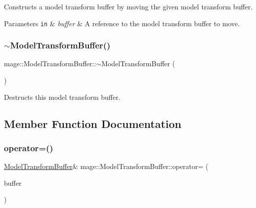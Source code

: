 Constructs a model transform buffer by moving the given model transform buffer.


\begin{DoxyParams}[1]{Parameters}
\mbox{\tt in}  & {\em buffer} & A reference to the model transform buffer to move. \\
\hline
\end{DoxyParams}
\hypertarget{structmage_1_1_model_transform_buffer_a08e8a2d136cfbdaa9f13917cdeec9b03}{}\label{structmage_1_1_model_transform_buffer_a08e8a2d136cfbdaa9f13917cdeec9b03} 
\subsubsection{\texorpdfstring{$\sim$\+Model\+Transform\+Buffer()}{~ModelTransformBuffer()}}
{\footnotesize\ttfamily mage\+::\+Model\+Transform\+Buffer\+::$\sim$\+Model\+Transform\+Buffer (\begin{DoxyParamCaption}{ }\end{DoxyParamCaption})\hspace{0.3cm}{\ttfamily [default]}}

Destructs this model transform buffer. 

\subsection{Member Function Documentation}
\hypertarget{structmage_1_1_model_transform_buffer_a1b74e4281d67712623486e3a5e083083}{}\label{structmage_1_1_model_transform_buffer_a1b74e4281d67712623486e3a5e083083} 
\subsubsection{\texorpdfstring{operator=()}{operator=()}\hspace{0.1cm}{\footnotesize\ttfamily [1/2]}}
{\footnotesize\ttfamily \hyperlink{structmage_1_1_model_transform_buffer}{Model\+Transform\+Buffer}\& mage\+::\+Model\+Transform\+Buffer\+::operator= (\begin{DoxyParamCaption}\item[{const \hyperlink{structmage_1_1_model_transform_buffer}{Model\+Transform\+Buffer} \&}]{buffer }\end{DoxyParamCaption})\hspace{0.3cm}{\ttfamily [default]}}

